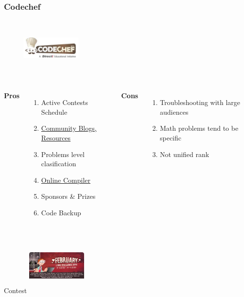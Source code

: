 \documentclass{beamer}
\begin{document}

\begin{frame}
	\frametitle{Codechef }
	\begin{figure}[t]
		\href{https://www.codechef.com/getting-started}{\includegraphics[width=3cm,height=3cm,keepaspectratio]{images/judges/codechef}}
	\end{figure}
	
	\begin{columns}[c] %
		\textbf{Pros}
		\begin{enumerate}
			\item Active Contests Schedule  
			\item \href{https://blog.codechef.com/}{Community Blogs, Resources}
			\item Problems level clasification
			\item \href{https://www.codechef.com/ide}{Online Compiler}
			\item Sponsors \& Prizes
			\item Code Backup
		\end{enumerate}
		\textbf{Cons}
		\begin{enumerate}
			\item Troubleshooting with large audiences
			\item Math problems tend to be specific
			\item Not unified rank
		\end{enumerate}
	\end{columns}
	\begin{block}{Contest}
	\center
	\href{https://www.codechef.com/JAN16} {\includegraphics[width=3cm,height=3cm,keepaspectratio]{images/contests/long_challenge}}

\end{block}
\end{frame}
\end{document}
